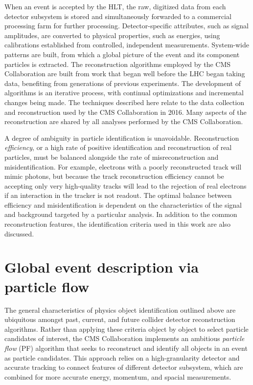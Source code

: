 When an event is accepted by the HLT, the raw, digitized data from each detector
subsystem is stored and simultaneously forwarded to a commercial processing farm for
further processing. Detector-specific attributes, such as signal amplitudes,
are converted to physical properties, such as energies, using calibrations
established from controlled, independent measurements. System-wide patterns
are built, from which a global picture of the event and its component particles
is extracted.
The reconstruction algorithms employed by the CMS Collaboration are built from
work that began well before the LHC began taking data, 
benefiting from generations of previous experiments. The development of algorithms
is an iterative process, with continual optimizations and incremental changes
being made. The techniques described here relate to the data collection and reconstruction
used by the CMS Collaboration in 2016. Many aspects of the reconstruction
are shared by all analyses performed by the CMS Collaboration. 

A degree of ambiguity in particle identification is unavoidable. 
Reconstruction \emph{efficiency}, or a high rate of positive identification
and reconstruction of real particles, must be balanced alongside the rate of misreconstruction
and misidentification.
For example, electrons with a poorly reconstructed track will mimic photons,
but because the track reconstruction efficiency cannot be 
accepting only very high-quality tracks will lead to the rejection
of real electrons if an interaction in the tracker is not readout.
The optimal balance between efficiency and misidentification is dependent
on the characteristics of the signal and background targeted by a particular
analysis. In addition to the common reconstruction features, the identification 
criteria used in this work are also discussed.

\section{Global event description via particle flow}
The general characteristics of physics object identification outlined
above are ubiquitous amongst past, current, and future collider detector
reconstruction algorithms. Rather than applying these criteria object by
object to select particle candidates of interest, 
the CMS Collaboration implements an ambitious \emph{particle flow} (PF)
algorithm that seeks to reconstruct and identify all objects in an
event as particle candidates. This approach relies on a high-granularity
detector and accurate tracking to connect features of different detector
subsystem, which are combined for more accurate energy, momentum, and
spacial measurements. 

